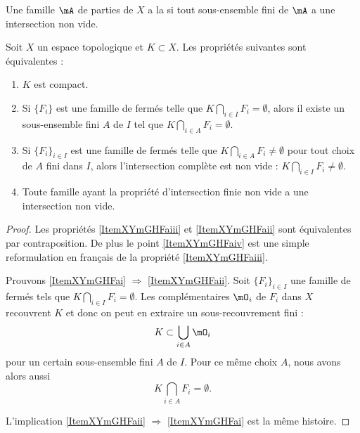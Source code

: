 \begin{definition}
    Une famille \( \mA\) de parties de \( X\) a la  si tout sous-ensemble fini de \( \mA\) a une intersection non vide.
\end{definition}

\begin{proposition}\label{PropXKUMiCj}
    Soit \( X\) un espace topologique et \( K\subset X\). Les propriétés suivantes sont équivalentes :
    \begin{enumerate}
        \item\label{ItemXYmGHFai}
            \( K\) est compact.
        \item\label{ItemXYmGHFaii}
            Si \( \{ F_i \}\) est une famille de fermés telle que \( K\bigcap_{i\in I}F_i=\emptyset\), alors il existe un sous-ensemble fini \( A\) de \( I\) tel que \( K\bigcap_{i\in A}F_i=\emptyset\).
        \item\label{ItemXYmGHFaiii}
            Si \( \{ F_i \}_{i\in I}\) est une famille de fermés telle que \( K\bigcap_{i\in A}F_i\neq\emptyset\) pour tout choix de \( A\) fini dans \( I\), alors l'intersection complète est non vide : \( K\bigcap_{i\in I}F_i\neq\emptyset\).
        \item\label{ItemXYmGHFaiv}
            Toute famille ayant la propriété d'intersection finie non vide a une intersection non vide.
    \end{enumerate}
\end{proposition}

\begin{proof}
    Les propriétés \ref{ItemXYmGHFaiii} et \ref{ItemXYmGHFaii} sont équivalentes par contraposition. De plus le point \ref{ItemXYmGHFaiv} est une simple reformulation en français de la propriété \ref{ItemXYmGHFaiii}.

    Prouvons \ref{ItemXYmGHFai} \( \Rightarrow\) \ref{ItemXYmGHFaii}. Soit \( \{ F_i \}_{i\in I}\) une famille de fermés tels que \( K\bigcap_{i\in I}F_i=\emptyset\). Les complémentaires \( \mO_i\) de \( F_i\) dans \( X\) recouvrent \( K\) et donc on peut en extraire un sous-recouvrement fini :
    \begin{equation}
        K\subset\bigcup_{i\in A}\mO_i
    \end{equation}
    pour un certain sous-ensemble fini \( A\) de \( I\). Pour ce même choix \( A\), nous avons alors aussi
    \begin{equation}
        K\bigcap_{i\in A}F_i=\emptyset.
    \end{equation}

    L'implication \ref{ItemXYmGHFaii} \( \Rightarrow\) \ref{ItemXYmGHFai} est la même histoire.
\end{proof}

